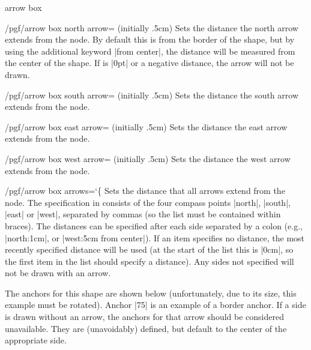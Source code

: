 \begin{shape}{arrow box}
\begin{key}{/pgf/arrow box north arrow= (initially .5cm)}
  Sets the distance the north arrow extends from the node. By default this
  is from the border of the shape, but by using the additional keyword
  |from center|, the distance will be measured from the center of the
  shape. If  is |0pt| or a negative distance, the arrow
  will not be drawn.
\end{key}

\begin{key}{/pgf/arrow box south arrow= (initially .5cm)}
	Sets the distance the south arrow extends from the node.
\end{key}

\begin{key}{/pgf/arrow box east arrow= (initially .5cm)}
	Sets the distance the east arrow extends from the node.
\end{key}

\begin{key}{/pgf/arrow box west arrow= (initially .5cm)}
	Sets the distance the west arrow extends from the node.
\end{key}

\begin{key}{/pgf/arrow box arrows={\ttfamily\char`\{}}
  Sets the distance that all arrows extend from the node. The
  specification in  consists of the four compass points
  |north|, |south|, |east| or |west|, separated by commas (so the list
  must be contained within braces).
  The distances can be specified after each side separated by a colon
  (e.g., |north:1cm|, or |west:5cm from center|).
  If an item specifies no distance, the most recently specified
  distance will be used (at the start of the list this is |0cm|,
  so the first item in the list should specify a distance).
  Any sides not specified will not be drawn with an arrow.
\end{key}

The anchors for this shape are shown below (unfortunately, due to its
size, this example must be rotated). Anchor |75| is an example of a
border anchor.
If a side is drawn without an arrow, the anchors for that arrow should
be considered unavailable. They are (unavoidably) defined, but default
to the center of the appropriate side.


\end{shape}
